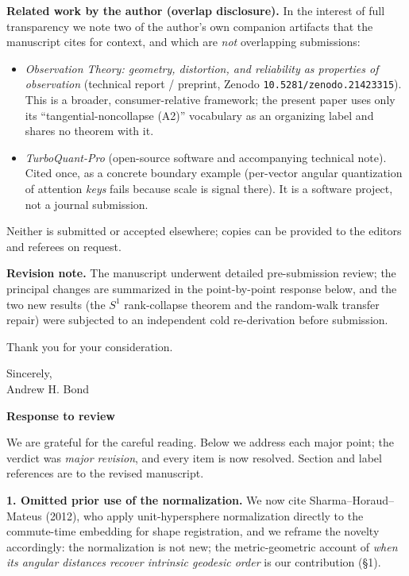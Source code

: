\documentclass[11pt]{article}
\begin{document}
\textbf{Related work by the author (overlap disclosure).} In the interest of full
transparency we note two of the author's own companion artifacts that the
manuscript cites for context, and which are \emph{not} overlapping submissions:
\begin{itemize}[nosep,leftmargin=1.4em]
  \item \emph{Observation Theory: geometry, distortion, and reliability as
  properties of observation} (technical report / preprint, Zenodo
  \texttt{10.5281/zenodo.21423315}). This is a broader, consumer-relative
  framework; the present paper uses only its ``tangential-noncollapse (A2)''
  vocabulary as an organizing label and shares no theorem with it.
  \item \emph{TurboQuant-Pro} (open-source software and accompanying technical
  note). Cited once, as a concrete boundary example (per-vector angular
  quantization of attention \emph{keys} fails because scale is signal there).
  It is a software project, not a journal submission.
\end{itemize}
Neither is submitted or accepted elsewhere; copies can be provided to the editors
and referees on request.

\textbf{Revision note.} The manuscript underwent detailed pre-submission review;
the principal changes are summarized in the point-by-point response below, and the
two new results (the $S^1$ rank-collapse theorem and the random-walk transfer
repair) were subjected to an independent cold re-derivation before submission.

Thank you for your consideration.

\bigskip
Sincerely,\\
Andrew H. Bond

\newpage
\begin{center}\large\textbf{Response to review}\end{center}

We are grateful for the careful reading. Below we address each major point; the
verdict was \emph{major revision}, and every item is now resolved. Section and
label references are to the revised manuscript.

\textbf{1. Omitted prior use of the normalization.} We now cite Sharma--Horaud--Mateus
(2012), who apply unit-hypersphere normalization directly to the commute-time
embedding for shape registration, and we reframe the novelty accordingly: the
normalization is not new; the metric-geometric account of \emph{when its angular
distances recover intrinsic geodesic order} is our contribution (\S1).
\end{document}
